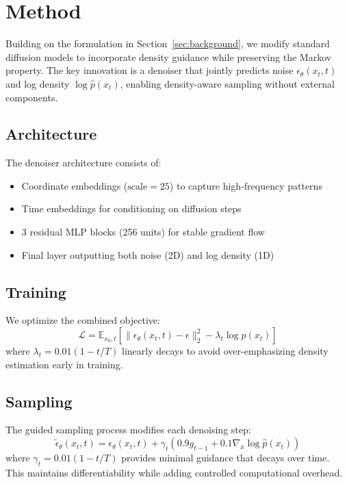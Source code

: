 \documentclass{article} %
\begin{document}
\section{Method}
\label{sec:method}

Building on the formulation in Section~\ref{sec:background}, we modify standard diffusion models to incorporate density guidance while preserving the Markov property. The key innovation is a denoiser that jointly predicts noise $\epsilon_\theta(x_t,t)$ and log density $\log\hat{p}(x_t)$, enabling density-aware sampling without external components.

\subsection{Architecture}
The denoiser architecture consists of:
\begin{itemize}
    \item Coordinate embeddings ($\mathrm{scale}=25$) to capture high-frequency patterns
    \item Time embeddings for conditioning on diffusion steps
    \item 3 residual MLP blocks (256 units) for stable gradient flow
    \item Final layer outputting both noise (2D) and log density (1D)
\end{itemize}

\subsection{Training}
We optimize the combined objective:
\begin{equation}
    \mathcal{L} = \mathbb{E}_{x_0,t}\left[\|\epsilon_\theta(x_t,t) - \epsilon\|^2_2 - \lambda_t\log\hat{p}(x_t)\right]
\end{equation}
where $\lambda_t = 0.01(1-t/T)$ linearly decays to avoid over-emphasizing density estimation early in training.

\subsection{Sampling}
The guided sampling process modifies each denoising step:
\begin{equation}
    \tilde{\epsilon}_\theta(x_t,t) = \epsilon_\theta(x_t,t) + \gamma_t(0.9 g_{t-1} + 0.1\nabla_x\log\hat{p}(x_t))
\end{equation}
where $\gamma_t = 0.01(1-t/T)$ provides minimal guidance that decays over time. This maintains differentiability while adding controlled computational overhead.
\end{document}
